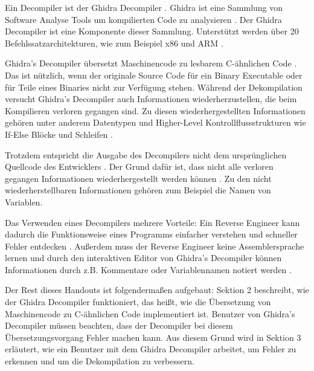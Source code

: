 Ein Decompiler ist der Ghidra Decompiler \cite{19}. Ghidra ist eine Sammlung von Software Analyse Tools um kompilierten Code zu analysieren \cite{19}. Der Ghidra Decompiler ist eine Komponente dieser Sammlung. Unterstützt werden über 20 Befehlssatzarchitekturen, wie zum Beispiel x86 und ARM \cite{5}.

Ghidra's Decompiler übersetzt Maschinencode zu lesbarem C-ähnlichen Code \cite{18}. Das ist nützlich, wenn der originale Source Code für ein Binary Executable oder für Teile eines Binaries nicht zur Verfügung stehen. Während der Dekompilation versucht Ghidra's Decompiler auch Informationen wiederherzustellen, die beim Kompilieren verloren gegangen sind. Zu diesen wiederhergestellten Informationen gehören unter anderem Datentypen \cite{18} und Higher-Level Kontrollflussstrukturen wie If-Else Blöcke und Schleifen \cite{8}.

Trotzdem entspricht die Ausgabe des Decompilers nicht dem ursprünglichen Quellcode des Entwicklers \cite{12}. Der Grund dafür ist, dass nicht alle verloren gegangen Informationen wiederhergestellt werden können \cite{12}. Zu den nicht wiederherstellbaren Informationen gehören zum Beispiel die Namen von Variablen.

Das Verwenden eines Decompilers mehrere Vorteile: Ein Reverse Engineer kann dadurch die Funktionsweise eines Programms einfacher verstehen und schneller Fehler entdecken \cite{17}. Außerdem muss der Reverse Engineer keine Assemblersprache lernen \cite{16} und durch den interaktiven Editor von Ghidra's Decompiler können Informationen durch z.B. Kommentare oder Variablennamen notiert werden \cite{18}. %

Der Rest dieses Handouts ist folgendermaßen aufgebaut: Sektion 2 beschreibt, wie der Ghidra Decompiler funktioniert, das heißt, wie die Übersetzung von Maschinencode zu C-ähnlichen Code implementiert ist. Benutzer von Ghidra's Decompiler müssen beachten, dass der Decompiler bei diesem Übersetzungsvorgang Fehler machen kann. Aus diesem Grund wird in Sektion 3 erläutert, wie ein Benutzer mit dem Ghidra Decompiler arbeitet, um Fehler zu erkennen und um die Dekompilation zu verbessern.


